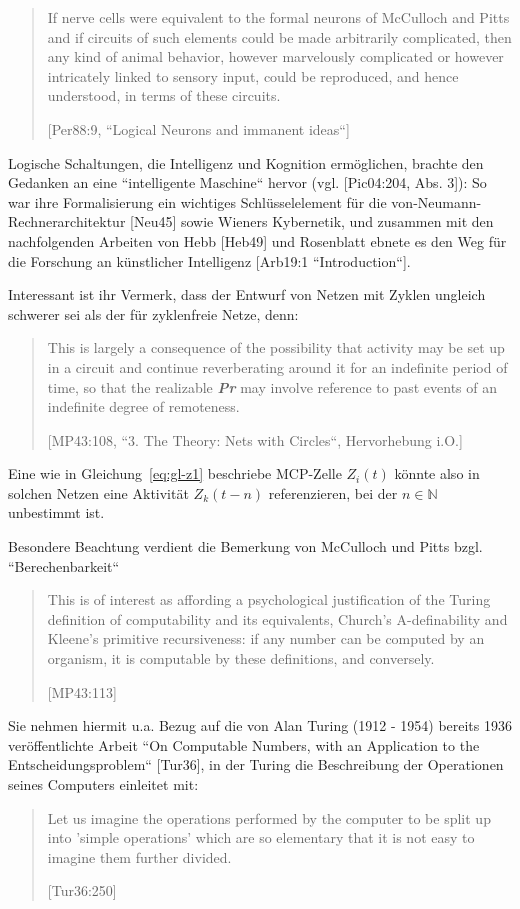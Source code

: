 \blockquote[{[Per88:9, ``Logical Neurons and immanent ideas``]}]{
If nerve cells were equivalent to the formal neurons of McCulloch and Pitts and if circuits of such elements could be made arbitrarily complicated, then any kind of animal behavior, however marvelously complicated or however intricately linked to sensory input, could be reproduced, and hence understood, in terms of these circuits.
}

Logische Schaltungen, die Intelligenz und Kognition ermöglichen, brachte den Gedanken an eine ``intelligente Maschine`` hervor (vgl. [Pic04:204, Abs. 3]): So war ihre Formalisierung ein wichtiges Schlüsselelement für die von-Neumann-Rechnerarchitektur [Neu45] sowie Wieners Kybernetik\footnotemark[2], und zusammen mit den nachfolgenden Arbeiten von Hebb [Heb49] und Rosenblatt ebnete es den Weg für die Forschung an künstlicher Intelligenz [Arb19:1 ``Introduction``].

\noindent
Interessant ist ihr Vermerk, dass der Entwurf von Netzen mit Zyklen ungleich schwerer sei als der für zyklenfreie Netze, denn:

\blockquote[{[MP43:108, ``3. The Theory: Nets with Circles``, Hervorhebung i.O.]}]{
 This is largely a consequence of the possibility that activity may be set up in a circuit and continue reverberating around it for an indefinite period of time, so that the realizable \textbf{\textit{Pr}} may involve reference to past events of an indefinite degree of remoteness.
}

\noindent
Eine wie in Gleichung~\ref{eq:gl-z1} beschriebe MCP-Zelle $Z_i(t)$ könnte also in solchen Netzen eine Aktivität $Z_k(t-n)$ referenzieren, bei der $n \in \mathbb{N}$ unbestimmt ist.

\noindent
Besondere Beachtung verdient die Bemerkung von McCulloch und Pitts bzgl. ``Berechenbarkeit``

\blockquote[{[MP43:113]}]{
This is of interest as affording a psychological justification of the Turing definition of computability and its equivalents, Church’s A-definability and Kleene’s primitive recursiveness: if any number can be computed by an organism, it is computable by these definitions, and conversely.
}

\noindent
Sie nehmen hiermit u.a. Bezug auf die von Alan Turing (1912 - 1954) bereits 1936 veröffentlichte Arbeit ``On Computable Numbers, with an Application to the Entscheidungsproblem`` [Tur36], in der Turing die Beschreibung der Operationen seines Computers einleitet mit:

\blockquote[{[Tur36:250]}]{
Let us imagine the operations performed by the computer to be split up into 'simple operations' which are so elementary that it is not easy to imagine them further divided.
}

